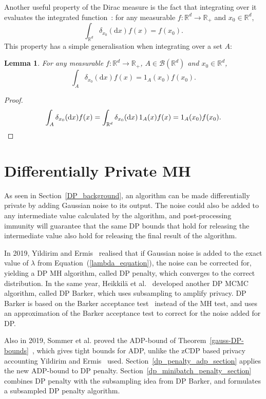 \documentclass[english,twoside,openright]{HYgraduMLDS}
\newtheorem{lemma}{Lemma}[chapter]
\newcommand{\R}{\mathbb{R}}
\newcommand{\dx}{\mathrm{d}}
\begin{document}
Another useful property of the Dirac measure is the fact that integrating
over it evaluates the integrated function~\cite{Cin11}: for any measurable
\(f\colon \R^{d}\to \R_{+}\) and \(x_{0}\in \R^{d}\),
\[
  \int_{\R^{d}}\delta_{x_{0}}(\dx x)f(x) = f(x_{0}).
\]
This property has a simple generalisation when integrating over a set \(A\):
\begin{lemma}\label{dirac_evaluation_lemma}
	For any measurable \(f\colon \R^{d}\to \R_{+}\), \(A\in \mathcal{B}(\R^{d})\)
  and \(x_{0}\in \R^{d}\),
  \[
    \int_{A}\delta_{x_{0}}(\dx x)f(x) = 1_{A}(x_{0})f(x_{0}).
  \]
\end{lemma}
\begin{proof}
  \[
    \int_{A}\delta_{x_{0}}(\dx x)f(x)
    = \int_{\R^{d}}\delta_{x_{0}}(\dx x)\, 1_{A}(x)f(x)
    = 1_{A}(x_{0})f(x_{0}).
    \qedhere
  \]
\end{proof}

\chapter{Differentially Private MH}\label{dp_mcmc_chapter}

As seen in Section~\ref{DP_background}, an algorithm can be made differentially 
private by adding Gaussian noise to its output. The noise could also be added
to any intermediate value calculated by the algorithm, and post-processing immunity
will guarantee that the same DP bounds that hold for releasing the intermediate 
value also hold for releasing the final result of the algorithm.

In 2019, Yildirim and Ermis~\cite{YildirimE19} realised that if Gaussian noise
is added to the exact value of \(\lambda\) from Equation~(\ref{lambda_equation}),
the noise can be corrected for,
yielding a DP MH algorithm, called DP penalty,
which converges to 
the correct distribution. In the same year, Heikkilä et al.~\cite{HeikkilaJDH19}
developed another DP MCMC algorithm, called DP Barker, which uses subsampling 
to amplify privacy. DP Barker is based on the Barker acceptance
test~\cite{Barker65} instead of the MH test, and uses an approximation
of the Barker acceptance test to correct for the noise added for DP.

Also in 2019, Sommer et al. proved the ADP-bound of
Theorem~\ref{gauss-DP-bounds}~\cite{Sommer2019}, which gives tight bounds for
ADP, unlike the zCDP based privacy accounting Yildirim and
Ermis~\cite{YildirimE19} used. Section~\ref{dp_penalty_adp_section} applies
the new ADP-bound to DP penalty.
Section~\ref{dp_minibatch_penalty_section} combines DP penalty with the
subsampling idea from DP Barker, and formulates a subsampled DP penalty
algorithm.
\end{document}
